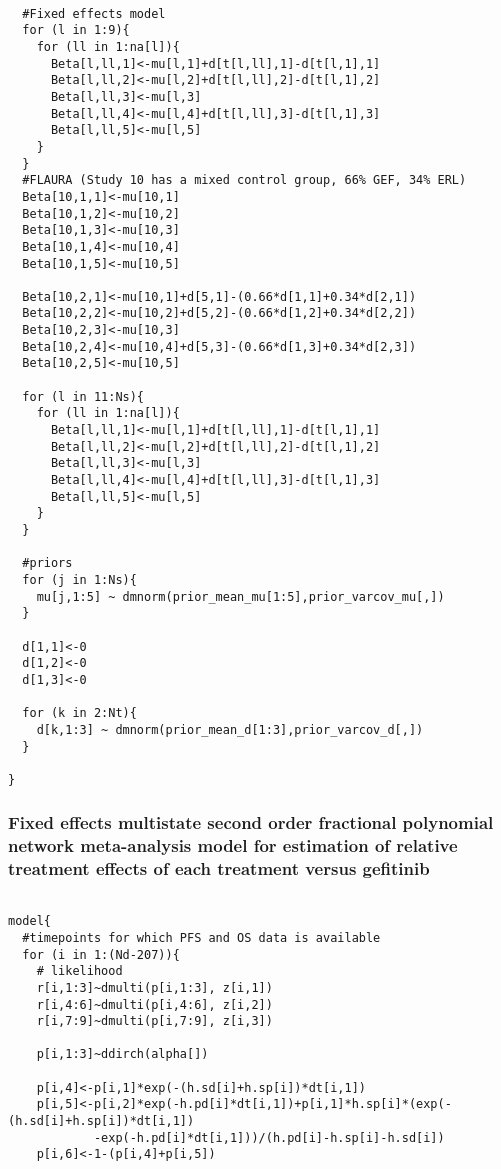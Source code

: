 \documentclass[11pt,final,fleqn]{article}\usepackage[]{graphicx}\usepackage[]{color}
\theoremstyle{plain}
\begin{document}
\begin{appendices}
\begin{verbatim}
 
  #Fixed effects model
  for (l in 1:9){
    for (ll in 1:na[l]){
      Beta[l,ll,1]<-mu[l,1]+d[t[l,ll],1]-d[t[l,1],1]
      Beta[l,ll,2]<-mu[l,2]+d[t[l,ll],2]-d[t[l,1],2]
      Beta[l,ll,3]<-mu[l,3]
      Beta[l,ll,4]<-mu[l,4]+d[t[l,ll],3]-d[t[l,1],3]
      Beta[l,ll,5]<-mu[l,5]
    }
  }
  #FLAURA (Study 10 has a mixed control group, 66% GEF, 34% ERL)
  Beta[10,1,1]<-mu[10,1]
  Beta[10,1,2]<-mu[10,2]
  Beta[10,1,3]<-mu[10,3]
  Beta[10,1,4]<-mu[10,4]
  Beta[10,1,5]<-mu[10,5]
  
  Beta[10,2,1]<-mu[10,1]+d[5,1]-(0.66*d[1,1]+0.34*d[2,1])
  Beta[10,2,2]<-mu[10,2]+d[5,2]-(0.66*d[1,2]+0.34*d[2,2])
  Beta[10,2,3]<-mu[10,3]
  Beta[10,2,4]<-mu[10,4]+d[5,3]-(0.66*d[1,3]+0.34*d[2,3])
  Beta[10,2,5]<-mu[10,5]
  
  for (l in 11:Ns){
    for (ll in 1:na[l]){
      Beta[l,ll,1]<-mu[l,1]+d[t[l,ll],1]-d[t[l,1],1]
      Beta[l,ll,2]<-mu[l,2]+d[t[l,ll],2]-d[t[l,1],2]
      Beta[l,ll,3]<-mu[l,3]
      Beta[l,ll,4]<-mu[l,4]+d[t[l,ll],3]-d[t[l,1],3]
      Beta[l,ll,5]<-mu[l,5]
    }
  }
  
  #priors
  for (j in 1:Ns){
    mu[j,1:5] ~ dmnorm(prior_mean_mu[1:5],prior_varcov_mu[,]) 
  }
  
  d[1,1]<-0
  d[1,2]<-0
  d[1,3]<-0

  for (k in 2:Nt){
    d[k,1:3] ~ dmnorm(prior_mean_d[1:3],prior_varcov_d[,]) 
  }

}

\end{verbatim}

\subsubsection{Fixed effects multistate second order fractional polynomial network meta-analysis model for estimation of relative treatment effects of each treatment versus gefitinib}
\begin{verbatim} 

model{
  #timepoints for which PFS and OS data is available
  for (i in 1:(Nd-207)){
    # likelihood
    r[i,1:3]~dmulti(p[i,1:3], z[i,1]) 
    r[i,4:6]~dmulti(p[i,4:6], z[i,2]) 
    r[i,7:9]~dmulti(p[i,7:9], z[i,3]) 
    
    p[i,1:3]~ddirch(alpha[])
    
    p[i,4]<-p[i,1]*exp(-(h.sd[i]+h.sp[i])*dt[i,1])
    p[i,5]<-p[i,2]*exp(-h.pd[i]*dt[i,1])+p[i,1]*h.sp[i]*(exp(-(h.sd[i]+h.sp[i])*dt[i,1])
    		-exp(-h.pd[i]*dt[i,1]))/(h.pd[i]-h.sp[i]-h.sd[i])
    p[i,6]<-1-(p[i,4]+p[i,5])
    

\end{verbatim}
\end{appendices}
\end{document}
